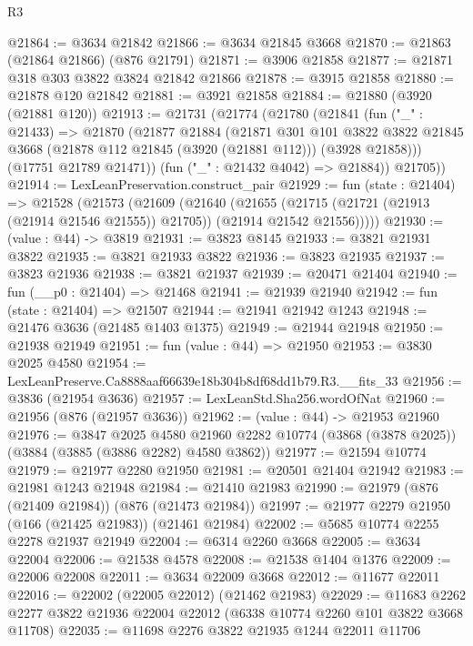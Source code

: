 \begin{lexlean}{R3}
\begin{coremodule}
@21864 := @3634 @21842
@21866 := @3634 @21845 @3668
@21870 := @21863 (@21864 @21866) (@876 @21791)
@21871 := @3906 @21858
@21877 := @21871 @318 @303 @3822 @3824 @21842 @21866
@21878 := @3915 @21858
@21880 := @21878 @120 @21842
@21881 := @3921 @21858
@21884 := @21880 (@3920 (@21881 @120))
@21913 := @21731
    (@21774
      (@21780
        (@21841
          (fun ("_" : @21433) =>
          @21870
            (@21877
              @21884
              (@21871
                @301
                @101
                @3822
                @3822
                @21845
                @3668
                (@21878 @112 @21845 (@3920 (@21881 @112)))
                (@3928 @21858)))
            (@17751 @21789 @21471))
          (fun ("_" : @21432 @4042) => @21884))
        @21705))
@21914 := LexLeanPreservation.construct_pair
@21929 := fun (state : @21404) =>
  @21528
    (@21573
      (@21609
        (@21640
          (@21655
            (@21715 (@21721 (@21913 (@21914 @21546 @21555)) @21705))
            (@21914 @21542 @21556)))))
@21930 := (value : @44) -> @3819
@21931 := @3823 @8145
@21933 := @3821 @21931 @3822
@21935 := @3821 @21933 @3822
@21936 := @3823 @21935
@21937 := @3823 @21936
@21938 := @3821 @21937
@21939 := @20471 @21404
@21940 := fun (__p0 : @21404) => @21468
@21941 := @21939 @21940
@21942 := fun (state : @21404) => @21507
@21944 := @21941 @21942 @1243
@21948 := @21476 @3636 (@21485 @1403 @1375)
@21949 := @21944 @21948
@21950 := @21938 @21949
@21951 := fun (value : @44) => @21950
@21953 := @3830 @2025 @4580
@21954 := LexLeanPreserve.Ca8888aaf66639e18b304b8df68dd1b79.R3.__fits_33
@21956 := @3836 (@21954 @3636)
@21957 := LexLeanStd.Sha256.wordOfNat
@21960 := @21956 (@876 (@21957 @3636))
@21962 := (value : @44) -> @21953 @21960
@21976 := @3847
    @2025
    @4580
    @21960
    @2282
    @10774
    (@3868 (@3878 @2025))
    (@3884 (@3885 (@3886 @2282) @4580 @3862))
@21977 := @21594 @10774
@21979 := @21977 @2280 @21950
@21981 := @20501 @21404 @21942
@21983 := @21981 @1243 @21948
@21984 := @21410 @21983
@21990 := @21979 (@876 (@21409 @21984)) (@876 (@21473 @21984))
@21997 := @21977 @2279 @21950 (@166 (@21425 @21983)) (@21461 @21984)
@22002 := @5685 @10774 @2255 @2278 @21937 @21949
@22004 := @6314 @2260 @3668
@22005 := @3634 @22004
@22006 := @21538 @4578
@22008 := @21538 @1404 @1376
@22009 := @22006 @22008
@22011 := @3634 @22009 @3668
@22012 := @11677 @22011
@22016 := @22002 (@22005 @22012) (@21462 @21983)
@22029 := @11683 @2262 @2277 @3822 @21936 @22004 @22012 (@6338 @10774 @2260 @101 @3822 @3668 @11708)
@22035 := @11698 @2276 @3822 @21935 @1244 @22011 @11706

\end{coremodule}
\end{lexlean}
